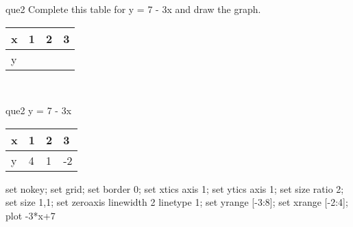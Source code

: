 \documentclass[13.5pt, varwidth=true]{beamer}
\begin{document}
\begin{frame}[shrink=19,fragile]
	\begin{beamercolorbox}[rounded=true, left, shadow=true,wd=14.8cm]{que2}
		 Complete this table for y = 7 - 3x and draw the graph. \\[0.3cm] \renewcommand{\arraystretch}{1.2}\begin{tabular}{|C|C|C|C|} \hline x & 1 & 2 & 3 \\ \hline y & & & \\ \hline \end{tabular}\\[0.3cm]
	\end{beamercolorbox}
\end{frame}
\begin{frame}[shrink=19,fragile]
	\begin{beamercolorbox}[rounded=true, left, shadow=true,wd=14.8cm]{que2}
		y = 7 - 3x\renewcommand{\arraystretch}{1.2}\begin{tabular}{|C|C|C|C|} \hline x & 1 & 2 & 3 \\ \hline y & 4 & 1 & -2\\ \hline \end{tabular}\begin{gnuplot}[terminal=pdf] set nokey; set grid; set border 0; set xtics axis 1; set ytics axis 1; set size ratio 2; set size 1,1; set zeroaxis linewidth 2 linetype 1; set yrange [-3:8]; set xrange [-2:4]; plot -3*x+7 \end{gnuplot}
	\end{beamercolorbox}
\end{frame}
\end{document}

